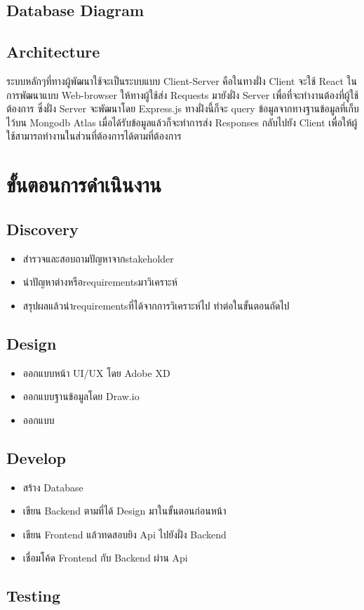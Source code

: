 \subsection{Database Diagram}


\subsection{Architecture}
ระบบหลักๆที่ทางผู้พัฒนาใช้จะเป็นระบบแบบ Client-Server คือในทางฝั่ง Client จะใช้ React ในการพัฒนาแบบ Web-browser ให้ทางผู้ใช้ส่ง Requests มายังฝั่ง Server เพื่อที่จะทำงานต้องที่ผู้ใช้ต้องการ ซึ่งฝั่ง Server 
จะพัฒนาโดย Express.js ทางฝั่งนี้ก็จะ query ข้อมูลจากทางฐานข้อมูลที่เก็บไว้บน Mongodb Atlas เมื่อได้รับข้อมูลแล้วก็จะทำการส่ง Responses กลับไปยัง Client เพื่อให้ผู้ใช้สามารถทำงานในส่วนที่ต้องการได้ตามที่ต้องการ


\section{ขั้นตอนการดำเนินงาน}
\subsection{Discovery}
\begin{itemize}
  \item สำรวจและสอบถามปัญหาจากstakeholder
  \item นำปัญหาต่างหรือrequirementsมาวิเคราะห์
  \item สรุปผลแล้วนำrequirementsที่ได้จากการวิเคราะห์ไป  ทำต่อในขั้นตอนถัดไป
\end{itemize}
\subsection{Design}
\begin{itemize}
  \item ออกแบบหน้า UI/UX โดย Adobe XD
  \item ออกแบบฐานข้อมูลโดย Draw.io
  \item ออกแบบ
\end{itemize}
\subsection{Develop}
\begin{itemize}
  \item สร้าง Database
  \item เขียน Backend ตามที่ได้ Design มาในขั้นตอนก่อนหน้า
  \item เขียน Frontend แล้วทดสอบยิง Api ไปยังฝั่ง Backend
  \item เชื่อมโค้ด Frontend กับ Backend ผ่าน Api
\end{itemize}
\subsection{Testing}
